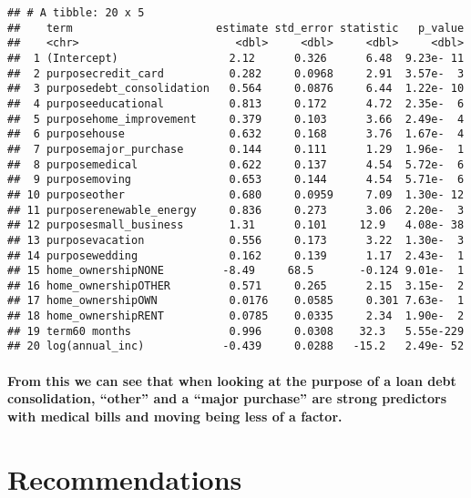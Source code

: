 \documentclass[
]{article}
\begin{document}
\begin{verbatim}
## # A tibble: 20 x 5
##    term                      estimate std_error statistic   p_value
##    <chr>                        <dbl>     <dbl>     <dbl>     <dbl>
##  1 (Intercept)                 2.12      0.326      6.48  9.23e- 11
##  2 purposecredit_card          0.282     0.0968     2.91  3.57e-  3
##  3 purposedebt_consolidation   0.564     0.0876     6.44  1.22e- 10
##  4 purposeeducational          0.813     0.172      4.72  2.35e-  6
##  5 purposehome_improvement     0.379     0.103      3.66  2.49e-  4
##  6 purposehouse                0.632     0.168      3.76  1.67e-  4
##  7 purposemajor_purchase       0.144     0.111      1.29  1.96e-  1
##  8 purposemedical              0.622     0.137      4.54  5.72e-  6
##  9 purposemoving               0.653     0.144      4.54  5.71e-  6
## 10 purposeother                0.680     0.0959     7.09  1.30e- 12
## 11 purposerenewable_energy     0.836     0.273      3.06  2.20e-  3
## 12 purposesmall_business       1.31      0.101     12.9   4.08e- 38
## 13 purposevacation             0.556     0.173      3.22  1.30e-  3
## 14 purposewedding              0.162     0.139      1.17  2.43e-  1
## 15 home_ownershipNONE         -8.49     68.5       -0.124 9.01e-  1
## 16 home_ownershipOTHER         0.571     0.265      2.15  3.15e-  2
## 17 home_ownershipOWN           0.0176    0.0585     0.301 7.63e-  1
## 18 home_ownershipRENT          0.0785    0.0335     2.34  1.90e-  2
## 19 term60 months               0.996     0.0308    32.3   5.55e-229
## 20 log(annual_inc)            -0.439     0.0288   -15.2   2.49e- 52
\end{verbatim}

\hypertarget{from-this-we-can-see-that-when-looking-at-the-purpose-of-a-loan-debt-consolidation-other-and-a-major-purchase-are-strong-predictors-with-medical-bills-and-moving-being-less-of-a-factor.}{%
\paragraph{From this we can see that when looking at the purpose of a
loan debt consolidation, ``other'' and a ``major purchase'' are strong
predictors with medical bills and moving being less of a
factor.}\label{from-this-we-can-see-that-when-looking-at-the-purpose-of-a-loan-debt-consolidation-other-and-a-major-purchase-are-strong-predictors-with-medical-bills-and-moving-being-less-of-a-factor.}}

\hypertarget{recommendations}{%
\section{Recommendations}\label{recommendations}}
\end{document}
